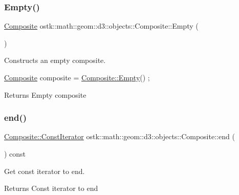 \subsubsection{\texorpdfstring{Empty()}{Empty()}}
{\footnotesize\ttfamily \hyperlink{classostk_1_1math_1_1geom_1_1d3_1_1objects_1_1_composite}{Composite} ostk\+::math\+::geom\+::d3\+::objects\+::\+Composite\+::\+Empty (\begin{DoxyParamCaption}{ }\end{DoxyParamCaption})\hspace{0.3cm}{\ttfamily [static]}}



Constructs an empty composite. 


\begin{DoxyCode}
\hyperlink{classostk_1_1math_1_1geom_1_1d3_1_1objects_1_1_composite_aaecda2f184484d63a52de87706a37d4c}{Composite} composite = \hyperlink{classostk_1_1math_1_1geom_1_1d3_1_1objects_1_1_composite_ab6ca471e3e731465d64148506869c93d}{Composite::Empty}() ;
\end{DoxyCode}


\begin{DoxyReturn}{Returns}
Empty composite 
\end{DoxyReturn}
\mbox{\label{classostk_1_1math_1_1geom_1_1d3_1_1objects_1_1_composite_abaaf231b9d0b5924ceb2b89db38cfe25}} 
\subsubsection{\texorpdfstring{end()}{end()}}
{\footnotesize\ttfamily \hyperlink{classostk_1_1math_1_1geom_1_1d3_1_1objects_1_1_composite_ab1f78408fec2e435dc1172cf2675b0a9}{Composite\+::\+Const\+Iterator} ostk\+::math\+::geom\+::d3\+::objects\+::\+Composite\+::end (\begin{DoxyParamCaption}{ }\end{DoxyParamCaption}) const}



Get const iterator to end. 

\begin{DoxyReturn}{Returns}
Const iterator to end 
\end{DoxyReturn}
\mbox{\label{classostk_1_1math_1_1geom_1_1d3_1_1objects_1_1_composite_a254785a50dc8deece73e24d2991704b6}} 
